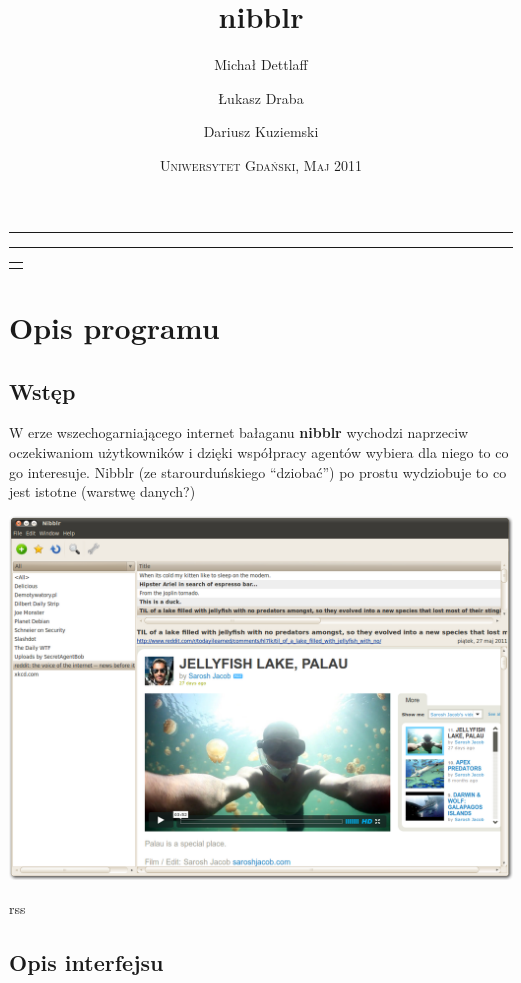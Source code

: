 \documentclass[a4paper,11pt]{report}
\title{nibblr}
\author{Michał Dettlaff \and Łukasz Draba \and Dariusz Kuziemski}
\date{\textsc{Uniwersytet Gdański, Maj 2011}}
\makeatletter
\newcommand{\linia}{\rule{\linewidth}{0.5mm}}
\renewcommand{\maketitle}{\begin{titlepage}
    \vspace*{5cm}
    \noindent\linia
    \begin{center} 
      \LARGE\textsc{\@title}
     \end{center}
     \linia
    \vspace{2cm}
    \begin{flushright}
    \begin{minipage}{5cm}
    \begin{tabular}[t]{l}%
    \@author
    \end{tabular}\par
    \end{minipage}
     \end{flushright}
    \vfill
    \begin{center}
    \@date
    \end{center}
  \end{titlepage}
}
\makeatother
\begin{document}
\maketitle

\section{Opis programu}

\subsection{Wstęp}
W erze wszechogarniającego internet bałaganu \textbf{nibblr} wychodzi naprzeciw
oczekiwaniom użytkowników i dzięki współpracy agentów wybiera dla niego to co go
interesuje. Nibblr (ze starourduńskiego ``dziobać'') %
po prostu wydziobuje to co jest istotne (warstwę danych?)

\begin{center}
 \includegraphics[scale=0.27]{./img/nibblr0.png}
\end{center}

rss
\newpage
\subsection{Opis interfejsu}

\end{document}
